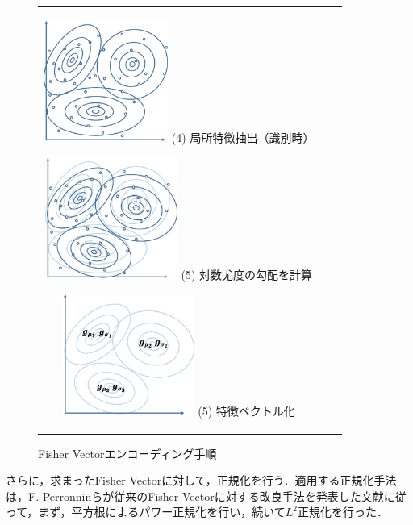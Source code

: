 \begin{figure}[htbp]
\begin{tabular}{ccc}
\begin{minipage}{0.33\textwidth}
  \begin{center}
   \includegraphics[height=40mm]{figure/fisher_4.eps}
   \hspace{1.6cm} (4) 局所特徴抽出（識別時）
  \end{center}
 \end{minipage}
%
 \begin{minipage}{0.33\textwidth}
  \begin{center}
   \includegraphics[height=40mm]{figure/fisher_5.eps}
   \hspace{1.6cm} (5) 対数尤度の勾配を計算
  \end{center}
 \end{minipage}
%
 \begin{minipage}{0.33\textwidth}
  \begin{center}
   \includegraphics[height=40mm]{figure/fisher_6.eps}
   \hspace{1.6cm} (5) 特徴ベクトル化
  \end{center}
 \end{minipage}
%
\end{tabular}
\caption{Fisher Vectorエンコーディング手順}
\label{fig:fisher_encoding}
\end{figure}

さらに，求まったFisher Vectorに対して，正規化を行う．適用する正規化手法は，F. Perronninらが従来のFisher Vectorに対する改良手法を発表した文献\cite{fisher_vector3}に従って，まず，平方根によるパワー正規化を行い，続いて$ L^2 $正規化を行った．

